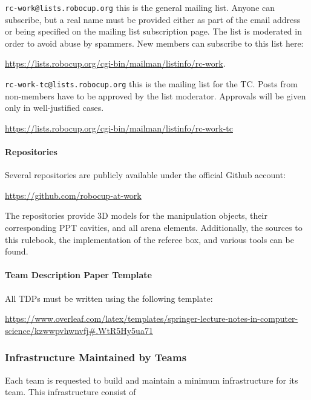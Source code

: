 \texttt{rc-work@lists.robocup.org} this is the general \RCAW mailing list. Anyone can subscribe, but a real name must be provided either as part of the email address or being specified on the mailing list subscription page. The list is moderated in order to avoid abuse by spammers. New members can subscribe to this list here: 
	\begin{center}
		\url{https://lists.robocup.org/cgi-bin/mailman/listinfo/rc-work}.
	\end{center}

\texttt{rc-work-tc@lists.robocup.org} this is the mailing list for the TC. Posts from non-members have to be approved by the list moderator. Approvals will be given only in well-justified cases.
\begin{center}
\url{https://lists.robocup.org/cgi-bin/mailman/listinfo/rc-work-tc}
\end{center}



\paragraph{Repositories}
Several repositories are publicly available under the official \RCAW Github account:
\begin{center}
\url{https://github.com/robocup-at-work}
\end{center}

The repositories provide 3D models for the manipulation objects, their corresponding PPT cavities, and all arena elements. Additionally, the sources to this rulebook, the implementation of the referee box, and various tools can be found.


\paragraph{Team Description Paper Template}
All TDPs must be written using the following template:
\begin{center}
	\url{https://www.overleaf.com/latex/templates/springer-lecture-notes-in-computer-science/kzwwpvhwnvfj#.WtR5Hy5ua71}
\end{center}


\subsubsection{Infrastructure Maintained by Teams}
Each team is requested to build and maintain a minimum infrastructure for its team. This infrastructure consist of


